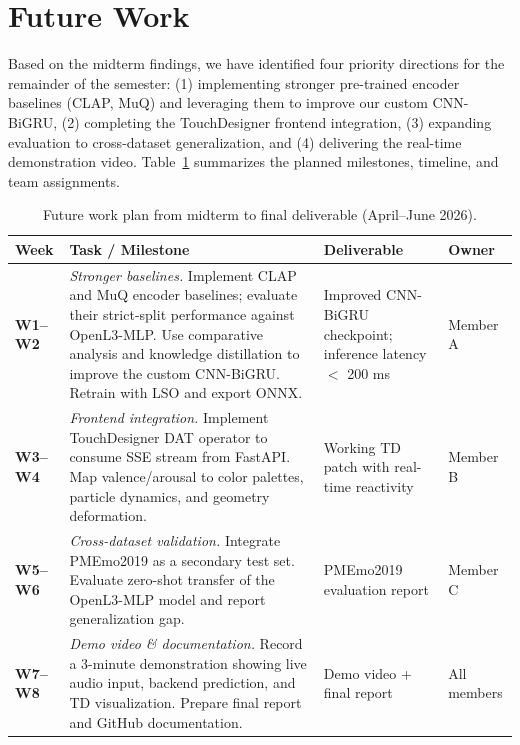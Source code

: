 \documentclass[12pt,a4paper]{article}
\begin{document}
\section{Future Work}

Based on the midterm findings, we have identified four priority directions for the remainder of the semester: (1) implementing stronger pre-trained encoder baselines (CLAP, MuQ) and leveraging them to improve our custom CNN-BiGRU, (2) completing the TouchDesigner frontend integration, (3) expanding evaluation to cross-dataset generalization, and (4) delivering the real-time demonstration video. Table~\ref{tab:future} summarizes the planned milestones, timeline, and team assignments.

\begin{table}[htbp]
\centering
\caption{Future work plan from midterm to final deliverable (April--June 2026).}
\label{tab:future}
\small
\begin{tabular}{@{}p{2.2cm}p{4.8cm}p{3.5cm}p{2.5cm}@{}}
\toprule
\textbf{Week} & \textbf{Task / Milestone} & \textbf{Deliverable} & \textbf{Owner} \\
\midrule
\textbf{W1--W2} & \textit{Stronger baselines.} Implement CLAP and MuQ encoder baselines; evaluate their strict-split performance against OpenL3-MLP. Use comparative analysis and knowledge distillation to improve the custom CNN-BiGRU. Retrain with LSO and export ONNX. & Improved CNN-BiGRU checkpoint; inference latency $<$ 200 ms & Member A \\
\midrule
\textbf{W3--W4} & \textit{Frontend integration.} Implement TouchDesigner DAT operator to consume SSE stream from FastAPI. Map valence/arousal to color palettes, particle dynamics, and geometry deformation. & Working TD patch with real-time reactivity & Member B \\
\midrule
\textbf{W5--W6} & \textit{Cross-dataset validation.} Integrate PMEmo2019 as a secondary test set. Evaluate zero-shot transfer of the OpenL3-MLP model and report generalization gap. & PMEmo2019 evaluation report & Member C \\
\midrule
\textbf{W7--W8} & \textit{Demo video \& documentation.} Record a 3-minute demonstration showing live audio input, backend prediction, and TD visualization. Prepare final report and GitHub documentation. & Demo video + final report & All members \\
\bottomrule
\end{tabular}
\end{table}
\end{document}
